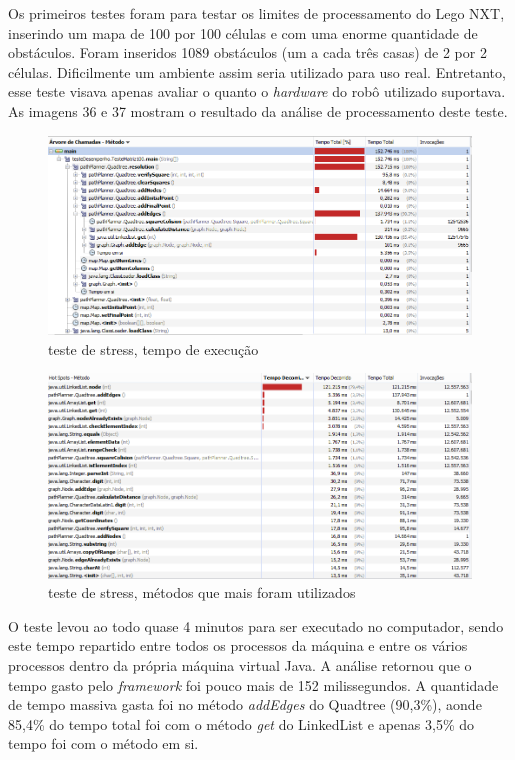Os primeiros testes foram para testar os limites de processamento do Lego NXT, inserindo um mapa de 100 por 100 células e com uma enorme quantidade de obstáculos. Foram inseridos 1089 obstáculos (um a cada três casas) de 2 por 2 células. Dificilmente um ambiente assim seria utilizado para uso real. Entretanto, esse teste visava apenas avaliar o quanto o \textit{hardware} do robô utilizado suportava. As imagens 36 e 37 mostram o resultado da análise de processamento deste teste.

\begin{figure}[h]
	\centering
	\label{fig36}
		\includegraphics[keepaspectratio=true,scale=0.6]{figuras/teste100_1.PNG}
	\caption{teste de stress, tempo de execução}
\end{figure}

\begin{figure}[h]
	\centering
	\label{fig37}
		\includegraphics[keepaspectratio=true,scale=0.6]{figuras/teste100_2.PNG}
	\caption{teste de stress, métodos que mais foram utilizados}
\end{figure}

O teste levou ao todo quase 4 minutos para ser executado no computador, sendo este tempo repartido entre todos os processos da máquina e entre os vários processos dentro da própria máquina virtual Java. A análise retornou que o tempo gasto pelo \textit{framework} foi pouco mais de 152 milissegundos. A quantidade de tempo massiva gasta foi no método \textit{addEdges} do Quadtree (90,3\%), aonde 85,4\% do tempo total foi com o método \textit{get} do LinkedList e apenas 3,5\% do tempo foi com o método em si.

